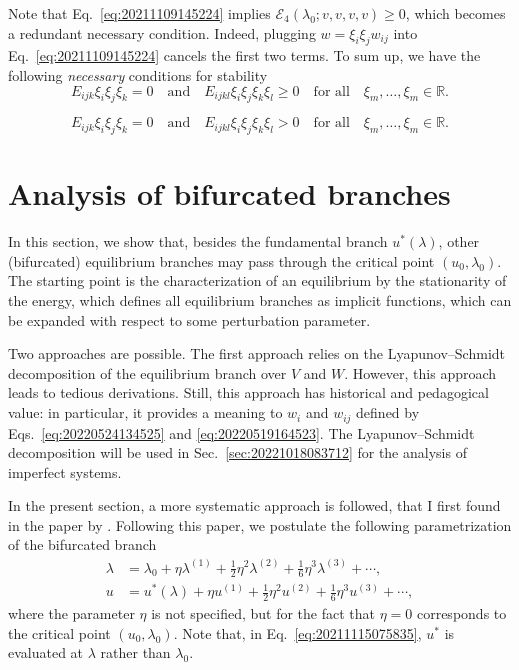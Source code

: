 \documentclass[12pt, final]{scrartcl}
\theoremstyle{definition}
\newcommand{\E}{\mathcal E}
\newcommand{\order}[2][1]{#2^{(#1)}}
\newcommand{\reals}{\mathbb{R}}
\begin{document}
Note that Eq.~\eqref{eq:20211109145224} implies $\E_4(\lambda_0; v, v, v, v) \geq 0$, which becomes a redundant
necessary condition. Indeed, plugging $w= \xi_i \xi_j w_{ij}$ into Eq.~\eqref{eq:20211109145224} cancels the first two
terms. To sum up, we have the following \emph{necessary} conditions for stability
\begin{equation}
  E_{ijk} \xi_i \xi_j \xi_k = 0 \quad \text{and} \quad E_{ijkl} \xi_i \xi_j \xi_k \xi_l \geq 0 \quad \text{for all} \quad \xi_m, \ldots, \xi_m \in \reals.
\end{equation}

\begin{equation}
  E_{ijk} \xi_i \xi_j \xi_k = 0 \quad \text{and} \quad E_{ijkl} \xi_i \xi_j \xi_k \xi_l > 0 \quad \text{for all} \quad \xi_m, \ldots, \xi_m \in \reals.
\end{equation}

\section{Analysis of bifurcated branches}
\label{sec:20220617075558}

In this section, we show that, besides the fundamental branch $u^\ast(\lambda)$, other (bifurcated) equilibrium branches
may pass through the critical point $(u_0, \lambda_0)$. The starting point is the characterization of an equilibrium by
the stationarity of the energy, which defines all equilibrium branches as implicit functions, which can be expanded with
respect to some perturbation parameter.

Two approaches are possible. The first approach relies on the Lyapunov--Schmidt decomposition of the equilibrium branch
over $V$ and $W$. However, this approach leads to tedious derivations. Still, this approach has historical and
pedagogical value: in particular, it provides a meaning to $w_i$ and $w_{ij}$ defined by Eqs.~\eqref{eq:20220524134525}
and \eqref{eq:20220519164523}. The Lyapunov--Schmidt decomposition will be used in Sec.~\ref{sec:20221018083712} for the
analysis of imperfect systems.

In the present section, a more systematic approach is followed, that I first found in the paper by \textcite[][Appendix
A]{chak2018}. Following this paper, we postulate the following parametrization of the bifurcated branch
\begin{align}
  \label{eq:20211115075817}
  \lambda &=  \lambda_0 + \eta \order[1]{\lambda} + \tfrac{1}{2} \eta^2 \order[2]{\lambda} + \tfrac{1}{6} \eta^3 \order[3]{\lambda} + \cdots,\\
  \label{eq:20211115075835}
  u &= u^{\ast}(\lambda) + \eta \order[1]{u} + \tfrac{1}{2} \eta^2 \order[2]{u} + \tfrac{1}{6} \eta^3 \order[3]{u} + \cdots,
\end{align}
where the parameter $\eta$ is not specified, but for the fact that $\eta = 0$ corresponds to the critical point
$(u_0, \lambda_0)$. Note that, in Eq.~\eqref{eq:20211115075835}, $u^\ast$ is evaluated at $\lambda$ rather than
$\lambda_0$.
\end{document}
